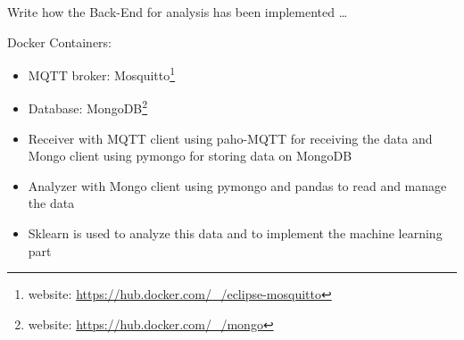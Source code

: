 Write how the Back-End for analysis has been implemented \dots

Docker Containers:
\begin{itemize}
  \item MQTT broker: Mosquitto\footnote{ website: \url{https://hub.docker.com/_/eclipse-mosquitto} }
  \item Database: MongoDB\footnote{ website: \url{https://hub.docker.com/_/mongo} }
  \item Receiver with MQTT client using paho-MQTT for receiving the data and Mongo client using pymongo for storing data on MongoDB
  \item Analyzer with Mongo client using pymongo and pandas to read and manage the data
  \item Sklearn is used to analyze this data and to implement the machine learning part
\end{itemize}
